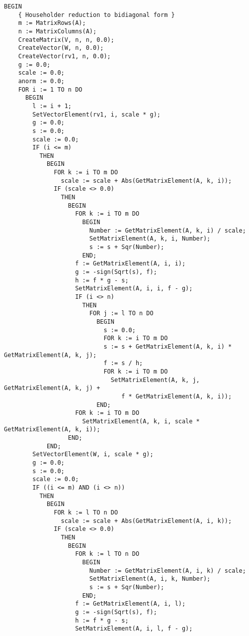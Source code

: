 \begin{lstlisting}[caption=Singular value decomposition]
  BEGIN
    { Householder reduction to bidiagonal form }
    m := MatrixRows(A);
    n := MatrixColumns(A);
    CreateMatrix(V, n, n, 0.0);
    CreateVector(W, n, 0.0);
    CreateVector(rv1, n, 0.0);
    g := 0.0;
    scale := 0.0;
    anorm := 0.0;
    FOR i := 1 TO n DO
      BEGIN
        l := i + 1;
        SetVectorElement(rv1, i, scale * g);
        g := 0.0;
        s := 0.0;
        scale := 0.0;
        IF (i <= m)
          THEN
            BEGIN
              FOR k := i TO m DO
                scale := scale + Abs(GetMatrixElement(A, k, i));
              IF (scale <> 0.0)
                THEN
                  BEGIN
                    FOR k := i TO m DO
                      BEGIN
                        Number := GetMatrixElement(A, k, i) / scale;
                        SetMatrixElement(A, k, i, Number);
                        s := s + Sqr(Number);
                      END;
                    f := GetMatrixElement(A, i, i);
                    g := -sign(Sqrt(s), f);
                    h := f * g - s;
                    SetMatrixElement(A, i, i, f - g);
                    IF (i <> n)
                      THEN
                        FOR j := l TO n DO
                          BEGIN
                            s := 0.0;
                            FOR k := i TO m DO
                            s := s + GetMatrixElement(A, k, i) * GetMatrixElement(A, k, j);
                            f := s / h;
                            FOR k := i TO m DO
                              SetMatrixElement(A, k, j, GetMatrixElement(A, k, j) +
                                 f * GetMatrixElement(A, k, i));
                          END;
                    FOR k := i TO m DO
                      SetMatrixElement(A, k, i, scale * GetMatrixElement(A, k, i));
                  END;
            END;
        SetVectorElement(W, i, scale * g);
        g := 0.0;
        s := 0.0;
        scale := 0.0;
        IF ((i <= m) AND (i <> n))
          THEN
            BEGIN
              FOR k := l TO n DO
                scale := scale + Abs(GetMatrixElement(A, i, k));
              IF (scale <> 0.0)
                THEN
                  BEGIN
                    FOR k := l TO n DO
                      BEGIN
                        Number := GetMatrixElement(A, i, k) / scale;
                        SetMatrixElement(A, i, k, Number);
                        s := s + Sqr(Number);
                      END;
                    f := GetMatrixElement(A, i, l);
                    g := -sign(Sqrt(s), f);
                    h := f * g - s;
                    SetMatrixElement(A, i, l, f - g);

\end{lstlisting}
